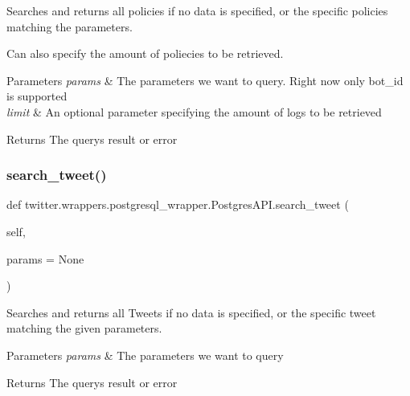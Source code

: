 Searches and returns all policies if no data is specified, or the specific policies matching the parameters. 

Can also specify the amount of poliecies to be retrieved.


\begin{DoxyParams}{Parameters}
{\em params} & The parameters we want to query. Right now only bot\+\_\+id is supported \\
\hline
{\em limit} & An optional parameter specifying the amount of logs to be retrieved\\
\hline
\end{DoxyParams}
\begin{DoxyReturn}{Returns}
The query\textquotesingle{}s result or error 
\end{DoxyReturn}
\mbox{\label{classtwitter_1_1wrappers_1_1postgresql__wrapper_1_1PostgresAPI_a772c1a47184e165cfe9958c78a97a146}} 
\subsubsection{\texorpdfstring{search\+\_\+tweet()}{search\_tweet()}}
{\footnotesize\ttfamily def twitter.\+wrappers.\+postgresql\+\_\+wrapper.\+Postgres\+A\+P\+I.\+search\+\_\+tweet (\begin{DoxyParamCaption}\item[{}]{self,  }\item[{}]{params = {\ttfamily None} }\end{DoxyParamCaption})}



Searches and returns all Tweets if no data is specified, or the specific tweet matching the given parameters. 


\begin{DoxyParams}{Parameters}
{\em params} & The parameters we want to query \\
\hline
\end{DoxyParams}
\begin{DoxyReturn}{Returns}
The query\textquotesingle{}s result or error 
\end{DoxyReturn}
\mbox{\label{classtwitter_1_1wrappers_1_1postgresql__wrapper_1_1PostgresAPI_a84fa6c90c91f88a68284fba6812b043f}} 
